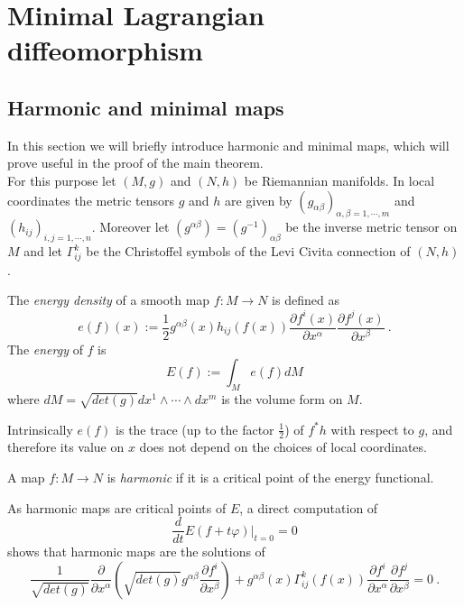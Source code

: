\chapter{Minimal Lagrangian diffeomorphism}

\section{Harmonic and minimal maps}
In this section we will briefly introduce harmonic and minimal maps, which will prove useful in the proof of the main theorem.\\
For this purpose let $(M,g)$ and $(N,h)$ be Riemannian manifolds. In local coordinates the metric tensors $g$ and $h$ are given by $(g_{\alpha \beta})_{\alpha,\beta = 1,\cdots, m}$ and $(h_{ij})_{i,j= 1,\cdots,n}$. Moreover let $(g^{\alpha \beta}) = (g^{-1})_{\alpha \beta}$ be the inverse metric tensor on $M$ and let $\Gamma^k_{ij}$ be the Christoffel symbols of the Levi Civita connection of $(N,h)$.\\
\begin{definition}
    The \textit{energy density} of a smooth map $f:M \to N$ is defined as
    \begin{equation}
        e(f)(x) := \frac{1}{2} g^{\alpha \beta}(x)h_{ij}(f(x)) \frac{\partial f^i (x)}{\partial x^\alpha}  \frac{\partial f^j (x)}{\partial x^\beta} \ .
    \end{equation}
    The \textit{energy} of $f$ is
    \begin{equation}
        E(f) := \int_M e(f)dM
    \end{equation}
    where $dM = \sqrt{det(g)} dx^1 \wedge \cdots \wedge dx^m$ is the volume form on $M$.
\end{definition}
\begin{observation}
    Intrinsically $e(f)$ is the trace (up to the factor $\frac{1}{2}$) of $f^* h$ with respect to $g$, and therefore its value on $x$ does not depend on the choices of local coordinates.
\end{observation}
\begin{definition}
    A map $f:M\to N$ is \textit{harmonic} if it is a critical point of the energy functional.
\end{definition}
As harmonic maps are critical points of $E$, a direct computation of
\[
    \frac{d}{dt}E(f+ t\varphi) |_{t=0} = 0
\]
shows that harmonic maps are the solutions of
\begin{equation} \label{eq:harmonic}
    \frac{1}{\sqrt{det(g)}} \frac{\partial}{\partial x^\alpha}(\sqrt{det(g)} g^{\alpha\beta} \frac{\partial f^i}{\partial x^\beta}) + g^{\alpha\beta}(x) \Gamma^k_{ij}(f(x)) \frac{\partial f^i}{\partial x^\alpha}  \frac{\partial f^j}{\partial x^\beta} = 0 \ .
\end{equation}
